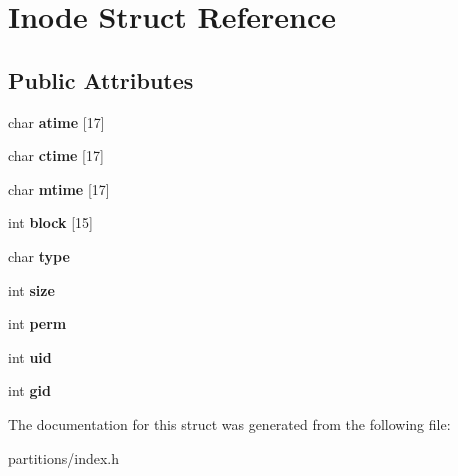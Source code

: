 \hypertarget{structInode}{}\section{Inode Struct Reference}
\label{structInode}
\subsection*{Public Attributes}
\begin{DoxyCompactItemize}
\item 
\mbox{\label{structInode_a1a0b7a2d0eacf3384ceacc30b5339fd5}} 
char {\bfseries atime} \mbox{[}17\mbox{]}
\item 
\mbox{\label{structInode_ac824acd449fcc512c5486fc5ed355f75}} 
char {\bfseries ctime} \mbox{[}17\mbox{]}
\item 
\mbox{\label{structInode_a0d7889b8ff6317ed4c11073dffba0ddd}} 
char {\bfseries mtime} \mbox{[}17\mbox{]}
\item 
\mbox{\label{structInode_ad00b0133f27b92819fc56dc833bf31c7}} 
int {\bfseries block} \mbox{[}15\mbox{]}
\item 
\mbox{\label{structInode_a742789b80d71e963d3bd98c6d4704a5a}} 
char {\bfseries type}
\item 
\mbox{\label{structInode_a222a216233050983f2f7b6c8ccbdce71}} 
int {\bfseries size}
\item 
\mbox{\label{structInode_a96bd0c95097c57c5133b457fbd93d362}} 
int {\bfseries perm}
\item 
\mbox{\label{structInode_acf389c19512ceb25e8e624dca171164c}} 
int {\bfseries uid}
\item 
\mbox{\label{structInode_a5d8f156e89ab3700e17246750c176716}} 
int {\bfseries gid}
\end{DoxyCompactItemize}


The documentation for this struct was generated from the following file\+:\begin{DoxyCompactItemize}
\item 
partitions/index.\+h\end{DoxyCompactItemize}
